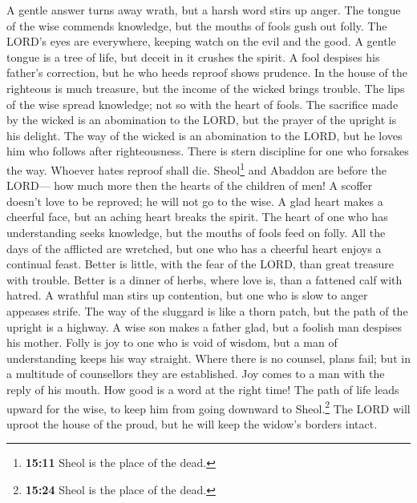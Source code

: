  A gentle answer turns away wrath, but a harsh word stirs
up anger.  The tongue of the wise commends knowledge, but
the mouths of fools gush out folly.  The LORD's eyes are
everywhere, keeping watch on the evil and the good.  A
gentle tongue is a tree of life, but deceit in it crushes the spirit.
 A fool despises his father's correction, but he who heeds
reproof shows prudence.  In the house of the righteous is
much treasure, but the income of the wicked brings trouble.
 The lips of the wise spread knowledge; not so with the
heart of fools.  The sacrifice made by the wicked is an
abomination to the LORD, but the prayer of the upright is his delight.
 The way of the wicked is an abomination to the LORD, but
he loves him who follows after righteousness.  There is
stern discipline for one who forsakes the way. Whoever hates reproof
shall die.  Sheol\footnote{\textbf{15:11} Sheol is the
  place of the dead.} and Abaddon are before the LORD--- how much more
then the hearts of the children of men!  A scoffer
doesn't love to be reproved; he will not go to the wise. 
A glad heart makes a cheerful face, but an aching heart breaks the
spirit.  The heart of one who has understanding seeks
knowledge, but the mouths of fools feed on folly.  All
the days of the afflicted are wretched, but one who has a cheerful heart
enjoys a continual feast.  Better is little, with the
fear of the LORD, than great treasure with trouble. 
Better is a dinner of herbs, where love is, than a fattened calf with
hatred.  A wrathful man stirs up contention, but one who
is slow to anger appeases strife.  The way of the
sluggard is like a thorn patch, but the path of the upright is a
highway.  A wise son makes a father glad, but a foolish
man despises his mother.  Folly is joy to one who is void
of wisdom, but a man of understanding keeps his way straight.
 Where there is no counsel, plans fail; but in a
multitude of counsellors they are established.  Joy comes
to a man with the reply of his mouth. How good is a word at the right
time!  The path of life leads upward for the wise, to
keep him from going downward to Sheol.\footnote{\textbf{15:24} Sheol is
  the place of the dead.}  The LORD will uproot the house
of the proud, but he will keep the widow's borders intact.
